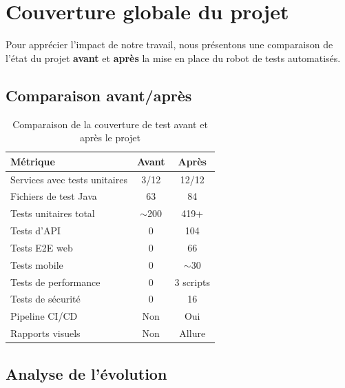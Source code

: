 \section{Couverture globale du projet}
\label{sec:couverture-globale}

Pour appr\'{e}cier l'impact de notre travail, nous pr\'{e}sentons une
comparaison de l'\'{e}tat du projet \textbf{avant} et \textbf{apr\`{e}s} la
mise en place du robot de tests automatis\'{e}s.

\subsection{Comparaison avant/apr\`{e}s}

\begin{table}[H]
\centering
\caption{Comparaison de la couverture de test avant et apr\`{e}s le projet}
\label{tab:avant-apres}
\begin{tabularx}{\textwidth}{|X|c|c|}
\hline
\rowcolor{speedlineBlue!10}
\textbf{M\'{e}trique} & \textbf{Avant} & \textbf{Apr\`{e}s} \\
\hline
Services avec tests unitaires & 3/12 & \textcolor{speedlineGreen}{12/12} \\
\hline
Fichiers de test Java & 63 & \textcolor{speedlineGreen}{84} \\
\hline
Tests unitaires total & $\sim$200 & \textcolor{speedlineGreen}{419+} \\
\hline
Tests d'API & 0 & \textcolor{speedlineGreen}{104} \\
\hline
Tests E2E web & 0 & \textcolor{speedlineGreen}{66} \\
\hline
Tests mobile & 0 & \textcolor{speedlineGreen}{$\sim$30} \\
\hline
Tests de performance & 0 & \textcolor{speedlineGreen}{3 scripts} \\
\hline
Tests de s\'{e}curit\'{e} & 0 & \textcolor{speedlineGreen}{16} \\
\hline
Pipeline CI/CD & Non & \textcolor{speedlineGreen}{Oui} \\
\hline
Rapports visuels & Non & \textcolor{speedlineGreen}{Allure} \\
\hline
\end{tabularx}
\end{table}

\subsection{Analyse de l'\'{e}volution}

